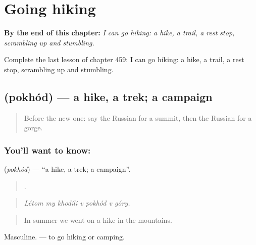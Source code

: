
\chapter{Going hiking}
\label{ch:ru-going-hiking}

\begin{chapteropening}
\textbf{By the end of this chapter:} \emph{I can go hiking: a hike, a trail, a rest stop, scrambling up and stumbling.}

Complete the last lesson of chapter 459: I can go hiking: a hike, a trail, a rest stop, scrambling up and stumbling.
\end{chapteropening}

\section[\texorpdfstring{\ru{поход} (pokhód)}{поход (pokhód)}]{ (pokhód) — a hike, a trek; a campaign}

\label{lesson:RU-C459-pokhod}



\begin{quote}
Before the new one: say the Russian for a summit, then the Russian for a gorge.
\end{quote}

\subsection*{You'll want to know: }
\textbf{} (\emph{pokhód}) — \textquotedblleft{}a hike, a trek; a campaign\textquotedblright{}.

\begin{quote}
      .
\end{quote}

\begin{quote}
\emph{Létom my khodíli v pokhód v góry.}
\end{quote}

\begin{quote}
In summer we went on a hike in the mountains.
\end{quote}

Masculine. \emph{  } — to go hiking or camping.

